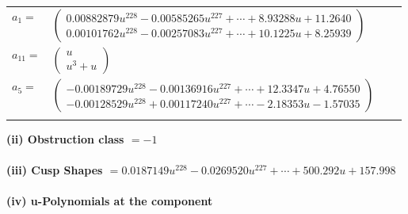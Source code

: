 \documentclass[1p]{elsarticle_modified}
\theoremstyle{definition}
\begin{document}
\begin{tabular}{m{7pt} m{180pt} m{7pt} m{180pt} }
\flushright $a_{1}=$&$\begin{pmatrix}0.00882879 u^{228}-0.00585265 u^{227}+\cdots+8.93288 u+11.2640\\0.00101762 u^{228}-0.00257083 u^{227}+\cdots+10.1225 u+8.25939\end{pmatrix}$ \\
\flushright $a_{11}=$&$\begin{pmatrix}u\\u^3+u\end{pmatrix}$ \\
\flushright $a_{5}=$&$\begin{pmatrix}-0.00189729 u^{228}-0.00136916 u^{227}+\cdots+12.3347 u+4.76550\\-0.00128529 u^{228}+0.00117240 u^{227}+\cdots-2.18353 u-1.57035\end{pmatrix}$\\&\end{tabular}
\flushleft \textbf{(ii) Obstruction class $= -1$}\\~\\
\flushleft \textbf{(iii) Cusp Shapes $= 0.0187149 u^{228}-0.0269520 u^{227}+\cdots+500.292 u+157.998$}\\~\\
\newpage\renewcommand{\arraystretch}{1}
\flushleft \textbf{(iv) u-Polynomials at the component}\newline \\
\end{document}
